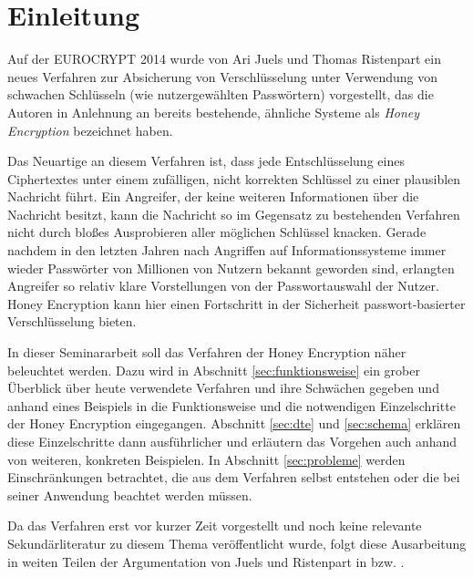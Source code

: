 \section{Einleitung}

Auf der EUROCRYPT 2014 wurde von Ari Juels und Thomas Ristenpart ein neues Verfahren zur Absicherung von Verschlüsselung unter Verwendung von schwachen Schlüsseln (wie nutzergewählten Passwörtern) vorgestellt, das die Autoren in Anlehnung an bereits bestehende, ähnliche Systeme als \emph{Honey Encryption} bezeichnet haben. 

Das Neuartige an diesem Verfahren ist, dass jede Entschlüsselung eines Ciphertextes unter einem zufälligen, nicht korrekten Schlüssel zu einer plausiblen Nachricht führt. Ein Angreifer, der keine weiteren Informationen über die Nachricht besitzt, kann die Nachricht so im Gegensatz zu bestehenden Verfahren nicht durch bloßes Ausprobieren aller möglichen Schlüssel knacken. Gerade nachdem in den letzten Jahren nach Angriffen auf Informationssysteme immer wieder Passwörter von Millionen von Nutzern bekannt geworden sind, erlangten  Angreifer so relativ klare Vorstellungen von der Passwortauswahl der Nutzer. Honey Encryption kann hier einen Fortschritt in der Sicherheit passwort-basierter Verschlüsselung bieten.

In dieser Seminararbeit soll das Verfahren der Honey Encryption näher beleuchtet werden. Dazu wird in Abschnitt \ref{sec:funktionsweise} ein grober Überblick über heute verwendete Verfahren und ihre Schwächen gegeben und anhand eines Beispiels in die Funktionsweise und die notwendigen Einzelschritte der Honey Encryption eingegangen. Abschnitt \ref{sec:dte} und \ref{sec:schema} erklären diese Einzelschritte dann ausführlicher und erläutern das Vorgehen auch anhand von weiteren, konkreten Beispielen. In Abschnitt \ref{sec:probleme} werden Einschränkungen betrachtet, die aus dem Verfahren selbst entstehen oder die bei seiner Anwendung beachtet werden müssen.

Da das Verfahren erst vor kurzer Zeit vorgestellt und noch keine relevante Sekundärliteratur zu diesem Thema veröffentlicht wurde, folgt diese Ausarbeitung in weiten Teilen der Argumentation von Juels und Ristenpart in \cite{IEEE2014} bzw. \cite{EURO2014}.

